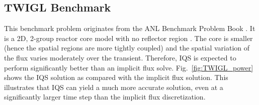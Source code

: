 \documentclass{elsarticle}
\newcommand{\fig}[1]{Fig.~\ref{#1}}                      %
\begin{document}
\subsection{TWIGL Benchmark}

This benchmark problem originates from the ANL Benchmark Problem Book \cite{ANL_BPB}.  It is a 2D, 2-group reactor core model with no reflector region \cite{TWIGL_benchmark}. The core is smaller (hence the spatial regions are more tightly coupled) and the spatial variation of the flux varies moderately over the transient. Therefore, IQS is expected to perform significantly better than an implicit flux solve. \fig{fig:TWIGL_power} shows the IQS  solution as compared with the implicit flux solution. This illustrates that IQS can yield a much more accurate solution, even at a significantly larger time step than the implicit flux discretization.
\end{document}
